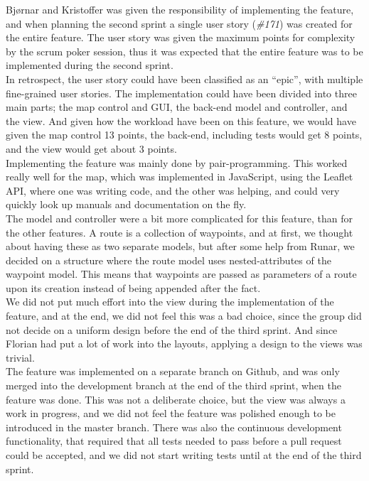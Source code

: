 \documentclass[a4paper]{article}
\begin{document}
\noindent
Bjørnar and Kristoffer was given the responsibility of implementing the feature, and when planning the second sprint a single user story (\emph{\#171}) was created for the entire feature. The user story was given the maximum points for complexity by the scrum poker session, thus it was expected that the entire feature was to be implemented during the second sprint. \\

\noindent
In retrospect, the user story could have been classified as an “epic”, with multiple fine-grained user stories. The implementation could have been divided into three main parts; the map control and GUI, the back-end model and controller, and the view. And given how the workload have been on this feature, we would have given the map control 13 points, the back-end, including tests would get 8 points, and the view would get about 3 points. \\

\noindent
Implementing the feature was mainly done by pair-programming. This worked really well for the map, which was implemented in JavaScript, using the Leaflet API, where one was writing code, and the other was helping, and could very quickly look up manuals and documentation on the fly. \\

\noindent
The model and controller were a bit more complicated for this feature, than for the other features. A route is a collection of waypoints, and at first, we thought about having these as two separate models, but after some help from Runar, we decided on a structure where the route model uses nested-attributes of the waypoint model. This means that waypoints are passed as parameters of a route upon its creation instead of being appended after the fact. \\

\noindent
We did not put much effort into the view during the implementation of the feature, and at the end, we did not feel this was a bad choice, since the group did not decide on a uniform design before the end of the third sprint. And since Florian had put a lot of work into the layouts, applying a design to the views was trivial. \\

\noindent
The feature was implemented on a separate branch on Github, and was only merged into the development branch at the end of the third sprint, when the feature was done. This was not a deliberate choice, but the view was always a work in progress, and we did not feel the feature was polished enough to be introduced in the master branch. There was also the continuous development functionality, that required that all tests needed to pass before a pull request could be accepted, and we did not start writing tests until at the end of the third sprint. \\
\end{document}
